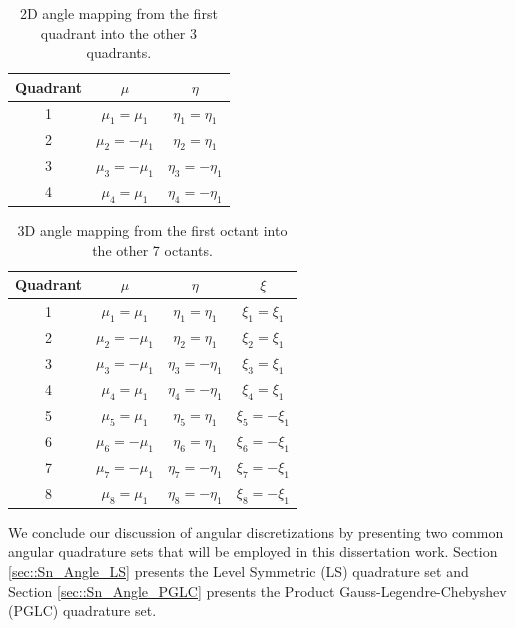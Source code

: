 \begin{table}[hbt]
\centering
\caption{2D angle mapping from the first quadrant into the other 3 quadrants.}
\begin{tabular}{|c|cc|}
	\hline
	Quadrant & $\mu$ & $\eta$ \\
	\hline
	1 & $\mu_1=\mu_1$ & $\eta_1=\eta_1$ \\
	\hline
	2 & $\mu_2=-\mu_1$ & $\eta_2=\eta_1$ \\
	\hline
	3 & $\mu_3=-\mu_1$ & $\eta_3=-\eta_1$ \\
	\hline
	4 & $\mu_4=\mu_1$ & $\eta_4=-\eta_1$ \\
	\hline
\end{tabular}
\label{tab::Sn_2D_octant_mapping}
\end{table}

\begin{table}[hbt]
\centering
\caption{3D angle mapping from the first octant into the other 7 octants.}
\begin{tabular}{|c|ccc|}
	\hline
	Quadrant & $\mu$ & $\eta$ & $\xi $ \\
	\hline
	1 & $\mu_1=\mu_1$ & $\eta_1=\eta_1$ & $\xi_1=\xi_1$ \\
	\hline
	2 & $\mu_2=-\mu_1$ & $\eta_2=\eta_1$ & $\xi_2=\xi_1$ \\
	\hline
	3 & $\mu_3=-\mu_1$ & $\eta_3=-\eta_1$ & $\xi_3=\xi_1$ \\
	\hline
	4 & $\mu_4=\mu_1$ & $\eta_4=-\eta_1$ & $\xi_4=\xi_1$ \\
	\hline
	5 & $\mu_5=\mu_1$ & $\eta_5=\eta_1$ & $\xi_5=-\xi_1$ \\
	\hline
	6 & $\mu_6=-\mu_1$ & $\eta_6=\eta_1$ & $\xi_6=-\xi_1$ \\
	\hline
	7 & $\mu_7=-\mu_1$ & $\eta_7=-\eta_1$ & $\xi_7=-\xi_1$ \\
	\hline
	8 & $\mu_8=\mu_1$ & $\eta_8=-\eta_1$ & $\xi_8=-\xi_1$ \\
	\hline
\end{tabular}
\label{tab::Sn_3D_octant_mapping}
\end{table}

We conclude our discussion of angular discretizations by presenting two common angular quadrature sets that will be employed in this dissertation work. Section \ref{sec::Sn_Angle_LS} presents the Level Symmetric (LS) quadrature set and Section \ref{sec::Sn_Angle_PGLC} presents the Product Gauss-Legendre-Chebyshev (PGLC) quadrature set.

